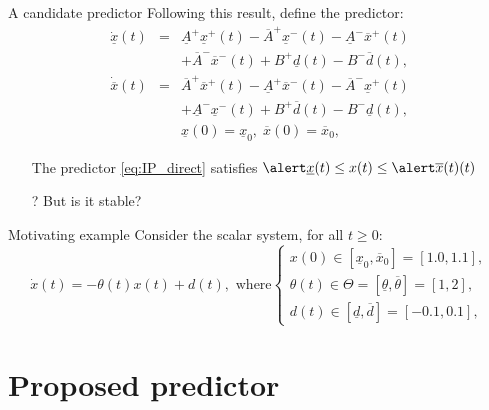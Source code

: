 \documentclass[slideopt,A4,showboxes,svgnames]{beamer}
\begin{document}
\begin{frame}{A candidate predictor}
Following this result, define the predictor:
\begin{eqnarray}
\dot{\underline{x}}(t) & = & \underline{A}^{+}\underline{x}^{+}(t)-\overline{A}^{+}\underline{x}^{-}(t)-\underline{A}^{-}\overline{x}^{+}(t)\nonumber \\
&  & +\overline{A}^{-}\overline{x}^{-}(t)+B^{+}\underline{d}(t)-B^{-}\overline{d}(t),\label{eq:IP_direct}\\
\dot{\overline{x}}(t) & = & \overline{A}^{+}\overline{x}^{+}(t)-\underline{A}^{+}\overline{x}^{-}(t)-\overline{A}^{-}\underline{x}^{+}(t)\nonumber \\
&  & +\underline{A}^{-}\underline{x}^{-}(t)+B^{+}\overline{d}(t)-B^{-}\underline{d}(t),\nonumber \\
&  & \underline{x}(0)=\underline{x}_{0},\;\overline{x}(0)=\overline{x}_{0},\nonumber
\end{eqnarray}
\pause
\begin{proposition}
	\begin{itemize}
		\item[\checkmark] The predictor \eqref{eq:IP_direct} satisfies $\ux\leq x(t)\leq \ox(t)$
	\end{itemize} 
\end{proposition}
\pause
\begin{itemize}
	\item[?] But is it stable?
\end{itemize}
\end{frame}
\begin{frame}{Motivating example}
Consider the scalar system, for all $t\geq0$:
\[
	\dot{x}(t)=-\theta(t)x(t)+d(t), \text{ where} 
	\begin{cases}
	x(0)\in[\underline{x}_{0},\overline{x}_{0}]=[1.0, 1.1],\\
	\theta(t)\in\Theta=[\underline{\theta},\overline{\theta}]=[1,2],\\
	d(t)\in[\underline{d},\overline{d}]=[-0.1,0.1],
	\end{cases}
\]


\end{frame}

\section{Proposed predictor}
\frame{\sectionpage}
\end{document}
